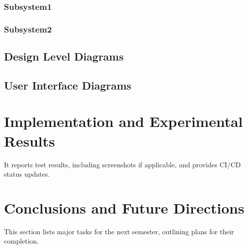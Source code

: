 \documentclass{article}
\begin{document}
        \subsubsection{Subsystem1}

        \subsubsection{Subsystem2}

    \subsection{Design Level Diagrams}

    \subsection{User Interface Diagrams}


\newpage


\section{Implementation and Experimental Results}

It reports test results, including screenshots if applicable, and provides CI/CD status updates. 



\newpage


\section{Conclusions and Future Directions}
This section lists major tasks for the next semester, outlining plans for their completion. 

\end{document}
